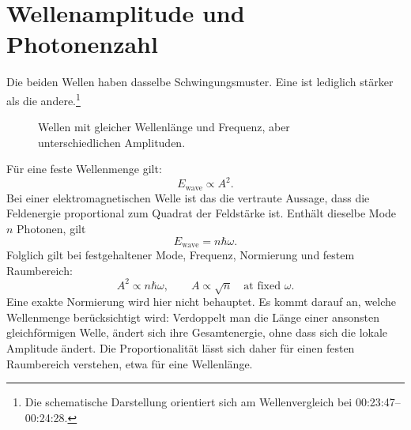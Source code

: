 \section{Wellenamplitude und Photonenzahl}

\begin{classroomqa}\end{classroomqa}

Die beiden Wellen haben dasselbe Schwingungsmuster. Eine ist lediglich stärker als die andere.\footnote{Die schematische Darstellung orientiert sich am Wellenvergleich bei 00:23:47--00:24:28.}

\begin{figure}[t]\centering
{}\caption{Wellen mit gleicher Wellenlänge und Frequenz, aber unterschiedlichen Amplituden.}\end{figure}

Für eine feste Wellenmenge gilt:
\begin{equation}
E_{\text{wave}}\propto A^2.
\end{equation}
Bei einer elektromagnetischen Welle ist das die vertraute Aussage, dass die Feldenergie proportional zum Quadrat der Feldstärke ist. Enthält dieselbe Mode \(n\) Photonen, gilt
\begin{equation}
E_{\text{wave}}=n\hbar\omega.
\end{equation}
Folglich gilt bei festgehaltener Mode, Frequenz, Normierung und festem Raumbereich:
\begin{equation}
A^2\propto n\hbar\omega,
\qquad
A\propto\sqrt n\quad\text{at fixed }\omega.
\end{equation}
Eine exakte Normierung wird hier nicht behauptet. Es kommt darauf an, welche Wellenmenge berücksichtigt wird: Verdoppelt man die Länge einer ansonsten gleichförmigen Welle, ändert sich ihre Gesamtenergie, ohne dass sich die lokale Amplitude ändert. Die Proportionalität lässt sich daher für einen festen Raumbereich verstehen, etwa für eine Wellenlänge.

